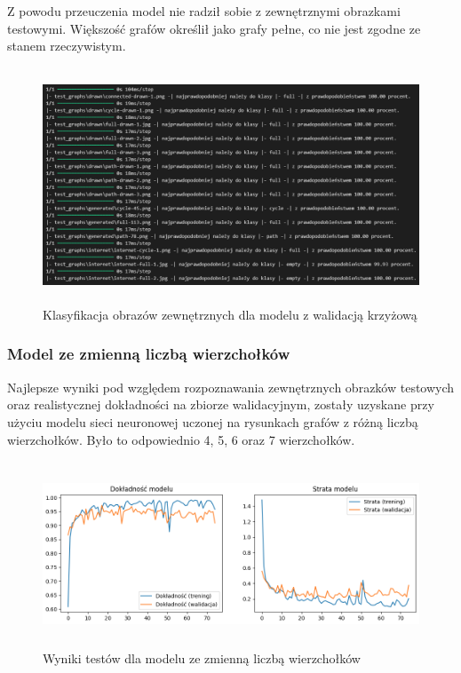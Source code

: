 Z powodu przeuczenia model nie radził sobie z zewnętrznymi obrazkami testowymi.
Większość grafów określił jako grafy pełne, co nie jest zgodne ze stanem rzeczywistym.

\begin{figure}[ht]
	\centering
	\includegraphics[height=7cm]{partials/images/tests/v2_crossvalid_img_tests.png}
	\caption{Klasyfikacja obrazów zewnętrznych dla modelu z walidacją krzyżową}
\label{Fig:GraphUndirected}
\end{figure}
\FloatBarrier

\subsubsection{Model ze zmienną liczbą wierzchołków}
Najlepsze wyniki pod względem rozpoznawania zewnętrznych obrazków testowych
oraz realistycznej dokładności na zbiorze walidacyjnym,
zostały uzyskane przy użyciu modelu sieci neuronowej uczonej na rysunkach grafów z różną liczbą wierzchołków.
Było to odpowiednio 4, 5, 6 oraz 7 wierzchołków.

\begin{figure}[ht]
	\centering
	\includegraphics[height=5.5cm]{partials/images/tests/v2_multiple_edges_epoch75.png}
	\caption{Wyniki testów dla modelu ze zmienną liczbą wierzchołków}
\label{Fig:GraphUndirected}
\end{figure}
\FloatBarrier

